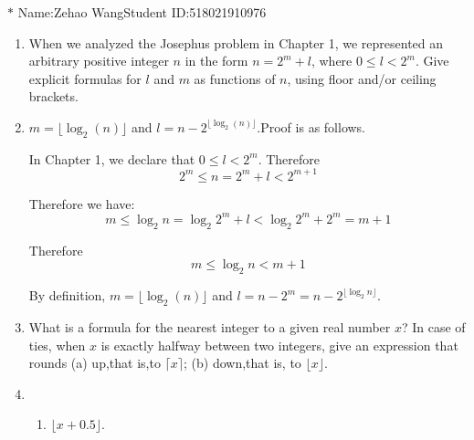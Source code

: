 \documentclass[12pt,a4paper]{article}
\makeatletter
\newtheorem*{solution}{Solution}
\theoremstyle{definition}
\renewenvironment{solution}[1][Solution] {\par\pushQED{\qed}\normalfont\topsep6\p@\@plus6\p@\relax\trivlist\item[\hskip\labelsep\bfseries#1\@addpunct{.}]\ignorespaces}{\popQED\endtrivlist\@endpefalse} \makeatother
\makeatother
\begin{document}
\noindent

\noindent{}
\begin{center}
\footnotesize{\color{blue}$*$ Name:Zehao Wang\quad Student ID:518021910976}
\end{center}

\begin{enumerate}
    \item 
        When we analyzed the Josephus problem in Chapter 1, we represented an arbitrary positive integer $n$ in the form $n=2^m+l$, where $0\le l <2^m$. Give explicit formulas for $l$ and $m$ as functions of $n$, using floor and/or ceiling brackets.
        \begin{solution}
        	$m=\lfloor \log_2(n)\rfloor$ and $l=n-2^{\lfloor \log_2(n)\rfloor}$.Proof is as follows.
        	
        	In Chapter 1, we declare that $0\le l<2^m$. Therefore 
        	\begin{equation*}
        	2^m\le n= 2^m+l<2^{m+1}
        	\end{equation*}
        	
        	Therefore we have:
        	\begin{equation*}
        	    m \le \log_2{n} = \log_2{2^m+l} < \log_2{2^m+2^m} =m+1
        	\end{equation*}
        	
        	Therefore
        	\begin{equation*}
        	    m \le \log_2{n} < m+1
        	\end{equation*}
        	
        	By definition, $m=\lfloor \log_2(n)\rfloor$ and $l=n-2^m=n-2^{\lfloor \log_2{n}\rfloor}$.
        \end{solution}
    \item 
        What is a formula for the nearest integer to a given real number $x$? In case of ties, when $x$ is exactly halfway between two integers, give an expression that rounds (a) up,that is,to $\lceil x\rceil$; (b) down,that is, to $\lfloor x \rfloor$.
        \begin{solution}
        	\begin{enumerate}
        		\item 
        		    $\lfloor x+0.5 \rfloor$.
        		    

\end{enumerate}
\end{solution}
\end{enumerate}
\end{document}
